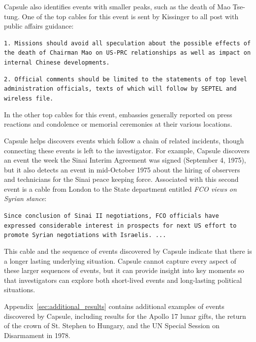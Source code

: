 Capsule also identifies events with smaller peaks, such as the death of Mao Tse-tung.  One of the top cables for this event is sent by Kissinger to all post with public affairs guidance: %
\begin{shaded*} \tt{1.  Missions should avoid all speculation about the 
possible effects of the death of Chairman Mao on
US-PRC relationships as well as impact on internal
Chinese developments.}

\tt{2.  Official comments should be limited to the statements
of top level administration officials, texts of which
will follow by SEPTEL and wireless file.}
\end{shaded*}
\noindent In the other top cables for this event, embassies generally reported on press reactions and condolence or memorial ceremonies at their various locations.

Capsule helps discovers events which follow a chain of related incidents, though connecting these events is left to the investigator.  For example, Capsule discovers an event the week the Sinai Interim Agreement was signed (September 4, 1975), but it also detects an event in mid-October 1975 about the hiring of observers and technicians for the Sinai peace keeping force.  Associated with this second event is a cable from London to the State department entitled \emph{FCO views on Syrian stance}:
\begin{shaded*} \tt{Since conclusion of Sinai II negotiations, FCO
officials have expressed considerable interest in prospects
for next US effort to promote Syrian negotiations with Israelis. ...}
\end{shaded*}
\noindent This cable and the sequence of events discovered by Capsule indicate that there is a longer lasting underlying situation.  Capsule cannot capture every aspect of these larger sequences of events, but it can provide insight into key moments so that investigators can explore both short-lived events and long-lasting political situations.

Appendix~\ref{sec:additional_results} contains additional examples of events discovered by Capsule, including results for the Apollo 17 lunar gifts, the return of the crown of St. Stephen to Hungary, and the UN Special Session on Disarmament in 1978.

